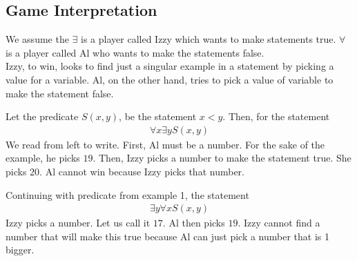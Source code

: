 \documentclass[a4paper]{article}
\theoremstyle{plain}
\theoremstyle{definition}
\newtheorem{exmp}{Example}[section]
\theoremstyle{remark}
\begin{document}
\subsection{Game Interpretation}
We assume the $\exists $ is a player called Izzy which wants to make statements true. $\forall $ is a player called Al who wants to make the statements false. \\
Izzy, to win, looks to find just a singular example in a statement by picking a value for a variable. Al, on the other hand, tries to pick a value of variable to make the statement false. 
\begin{tcolorbox}[colback=black!3!white,colframe=black!60!white,title=\begin{exmp}Example 1 \label{Example 1}\end{exmp}]
Let the predicate $S(x,y)$, be the statement $x<y$. Then, for the statement
\begin{align}
	\forall x \exists y S(x,y)	
\end{align}
We read from left to write. First, Al must be a number. For the sake of the example, he picks  $19$. Then, Izzy picks a number to make the statement true. She picks $20$. Al cannot win because Izzy picks that number.
\end{tcolorbox}
\begin{tcolorbox}[colback=black!3!white,colframe=black!60!white,title=\begin{exmp}Example 2 \label{Example 2}\end{exmp}]
Continuing with predicate from example 1, the statement
\begin{align}
	\exists y \forall x S(x,y)		
\end{align}
Izzy picks a number. Let us call it $17$. Al then picks $19$. Izzy cannot find a number that will make this true because Al can just pick a number that is 1 bigger.
\end{tcolorbox}
\end{document}
